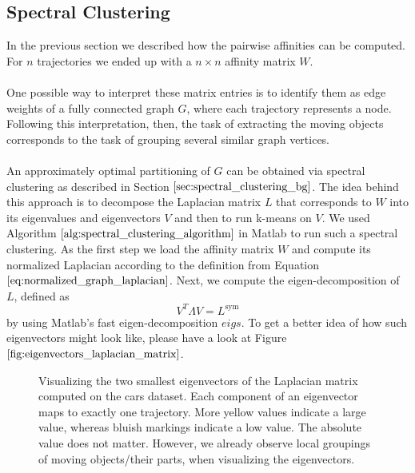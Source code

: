 \subsection{Spectral Clustering}
\label{sec:spectral_clustering_impl}
In the previous section we described how the pairwise affinities can be computed. For $n$ trajectories we ended up with a $n \times n$ affinity matrix $W$. \\ \\ 
One possible way to interpret these matrix entries is to identify them as edge weights of a fully connected graph $G$, where each trajectory represents a node. Following this interpretation, then, the task of extracting the moving objects  corresponds to the task of grouping several similar graph vertices. \\ \\
An approximately optimal partitioning of $G$ can be obtained via spectral clustering as described in Section $\ref{sec:spectral_clustering_bg}$. The idea behind this approach is to decompose the Laplacian matrix $L$ that corresponds to $W$ into its eigenvalues and eigenvectors $V$ and then to run k-means on $V$. We used Algorithm $\ref{alg:spectral_clustering_algorithm}$ in Matlab to run such a spectral clustering. As the first step we load the affinity matrix $W$ and compute its normalized Laplacian according to the definition from Equation $\ref{eq:normalized_graph_laplacian}$. Next, we compute the eigen-decomposition of $L$, defined as
\begin{equation}
	V^{T} \Lambda V = L^{\text{sym}}
\end{equation}
by using Matlab's fast eigen-decomposition $\textit{eigs}$. To get a better idea of how such eigenvectors might look like, please have a look at Figure $\ref{fig:eigenvectors_laplacian_matrix}$.
\begin{figure}[H]
\begin{center}
\end{center}
\caption[Eigenvectors of Laplacian Matrix]{Visualizing the two smallest eigenvectors of the Laplacian matrix computed on the cars dataset. Each component of an eigenvector maps to exactly one trajectory. More yellow values indicate a large value, whereas bluish markings indicate a low value. The absolute value does not matter. However, we already observe local groupings of moving objects/their parts, when visualizing the eigenvectors.}
\label{fig:eigenvectors_laplacian_matrix}
\end{figure}

